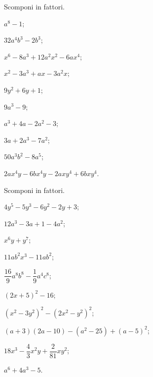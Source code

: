 \begin{esercizio}
 \label{ese:13.113}
 Scomponi in fattori.
\begin{multicols}{2}
 \begin{enumeratea}
\item $a^{{8}}-1$;
\item $32a^{4}b^{3} - 2b^{3}$;
\item $x^{6} - 8a^{3} + 12a^{2}x^{2} - 6ax^{4}$;
\item $x^{2} - 3a^{3} + ax - 3a^{2}x$;
\item $9y^{2}+6y+1$;
\item $9a^{3}-9$;
\item $a^{3}+4a-2a^{2}-3$;
\item $3a+2a^{3}-7a^{2}$;
\item $50a^{3}b^{2}-8a^{5}$;
\item $2ax^{4}y-6bx^{4}y-2axy^{4}+6bxy^{4}$.
 \end{enumeratea}
\end{multicols}
\end{esercizio}

\begin{esercizio}[\Ast]
 \label{ese:13.114}
 Scomponi in fattori.
 \begin{multicols}{2}
 \begin{enumeratea}
\item $4y^{5}-5y^{3}-6y^{2}-2y+3$;
\item $12a^{3}-3a+1-4a^{2}$;
\item $x^{6}y+y^{7}$;
\item $11ab^{2}x^{3}-11ab^{2}$;
\item $\dfrac{16}{9}a^{8}b^{8}-\dfrac{1}{9}a^{4}c^{8}$;
\item $(2x+5)^{2}-16$;
\item $\left(x^{2}-3y^{2}\right)^{2}-\left(2x^{2}-y^{2}\right)^{2}$;
\item $(a+3)(2a-10)-\left(a^{2}-25\right)+(a-5)^2$;
\item $18x^{3}-\dfrac{4}{3}x^{2}y+\dfrac{2}{81}xy^{2}$;
\item $a^{6}+4a^{3}-5$.
 \end{enumeratea}
 \end{multicols}
\end{esercizio}

